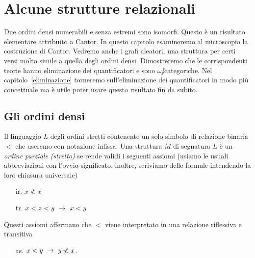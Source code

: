 \chapter{Alcune strutture relazionali}
\label{relazionali}

\def\ceq#1#2#3{\parbox{20ex}{$\displaystyle #1$}\parbox{4ex}{\hfil$#2$}$\displaystyle #3$}




Due ordini densi numerabili e senza estremi sono isomorfi. Questo \`e un risultato elementare attribuito a Cantor. In questo capitolo esamineremo al microscopio la costruzione di Cantor. Vedremo anche i grafi aleatori, una struttura per certi versi molto simile a quella degli ordini densi.  Dimostreremo che le corrispondenti teorie hanno eliminazione dei quantificatori e sono $\omega\jj$categoriche. Nel capitolo~\ref{eliminazione} torneremo sull'eliminazione dei quantificatori in modo pi\`u concettuale ma \`e utile poter usare questo risultato fin da subito. 

\section{Gli ordini densi}
\label{ordinilinearidensi}
Il linguaggio $L$ degli ordini stretti contenente un solo simbolo di relazione binaria $<$ che useremo con notazione infissa. Una struttura $M$ di segnatura $L$ \`e un \emph{ordine parziale (stretto)} se rende validi i seguenti assiomi (usiamo le usuali abbreviazioni con l'ovvio significato, inoltre, scriviamo delle formule intendendo la loro chiusura universale)

\begin{itemize}
\item[ir.] $x \not< x$
\item[tr.] $x< z< y\ \rightarrow\ x< y$
\end{itemize}

Questi assiomi affermano che  $<$ viene interpretato in una relazione riflessiva e transitiva
\begin{itemize}
\item[as.] $x<y\ \rightarrow\ y\not<x$.
\end{itemize}

